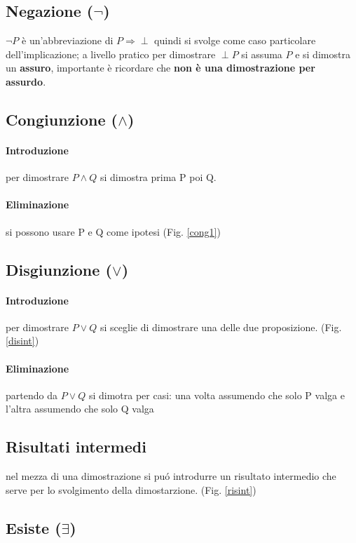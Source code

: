 \documentclass{article}
\begin{document}
\subsection{Negazione ($\neg$)} $\neg P$ è un'abbreviazione di $P\Rightarrow \perp$ quindi si svolge come caso particolare dell'implicazione; a livello pratico per dimostrare $\perp P$ si assuma $P$ e si dimostra un \textbf{assuro}, importante è ricordare che \textbf{non è una dimostrazione per assurdo}. 

\subsection{Congiunzione ($\land$)}
\paragraph{Introduzione} per dimostrare $P \land Q$ si dimostra prima P poi Q.
\paragraph{Eliminazione} si possono usare P e Q come ipotesi (Fig. \ref{cong1})

\subsection{Disgiunzione ($\lor$)}
\paragraph{Introduzione} per dimostrare $P\lor Q$ si sceglie di dimostrare una delle due proposizione. (Fig.\ref{disint})
\paragraph{Eliminazione} partendo da $P\lor Q$ si dimotra per casi: una volta assumendo che solo P valga e l'altra assumendo che solo Q valga

\subsection{Risultati intermedi} nel mezza di una dimostrazione si puó introdurre un risultato intermedio che serve per lo svolgimento della dimostarzione. (Fig. \ref{risint})

\subsection{Esiste ($\exists$)}
\end{document}
